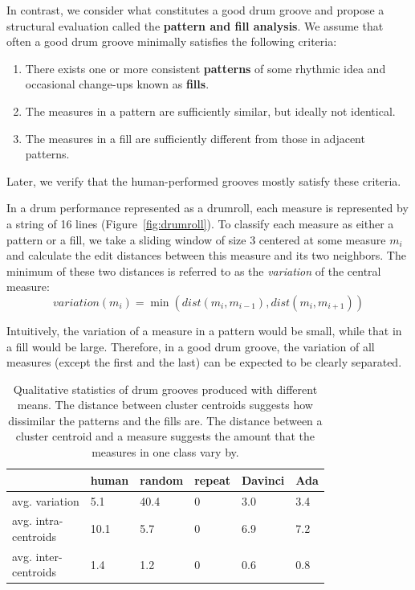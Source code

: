 \documentclass[letterpaper]{article} %
\begin{document}
In contrast, we consider what constitutes a good drum groove and propose a structural evaluation called the \textbf{pattern and fill analysis}. We assume that often a good drum groove minimally satisfies the following criteria: 
\begin{enumerate}
    \item There exists one or more consistent \textbf{patterns} of some rhythmic idea and occasional change-ups known as \textbf{fills}.
    \item The measures in a pattern are sufficiently similar, but ideally not identical.
    \item The measures in a fill are sufficiently different from those in adjacent patterns.
\end{enumerate}

Later, we verify that the human-performed grooves mostly satisfy these criteria. 

In a drum performance represented as a drumroll, each measure is represented by a string of 16 lines (Figure~\ref{fig:drumroll}). To classify each measure as either a pattern or a fill, we take a sliding window of size 3 centered at some measure $m_i$ and calculate the edit distances between this measure and its two neighbors. The minimum of these two distances is referred to as the \textit{variation} of the central measure:
$$\textit{variation}(m_i) = \min (dist(m_i,m_{i-1}),dist(m_i,m_{i+1}))$$

Intuitively, the variation of a measure in a pattern would be small, while that in a fill would be large. Therefore, in a good drum groove, the variation of all measures (except the first and the last) can be expected to be clearly separated. 

\begin{table}[t!]
\small
\centering
\begin{tabular}{llllll}
\toprule
            & human & random & repeat & Davinci & Ada \\ \midrule
avg. variation   &  5.1  &  40.4 & 0  & 3.0  &  3.4   \\
\makecell[l]{avg. intra- \\ centroids}   &  10.1  &  5.7 & 0  & 6.9  &  7.2   \\
\makecell[l]{avg. inter- \\ centroids}   &  1.4  &  1.2 & 0  & 0.6  &  0.8   \\
\bottomrule
\end{tabular}
\caption{Qualitative statistics of drum grooves produced with different means. The distance between cluster centroids 
 suggests how dissimilar the patterns and the fills are. The distance between a cluster centroid and a measure suggests the amount that the measures in one class vary by.}
\label{tab:variation}
\end{table}
\end{document}
